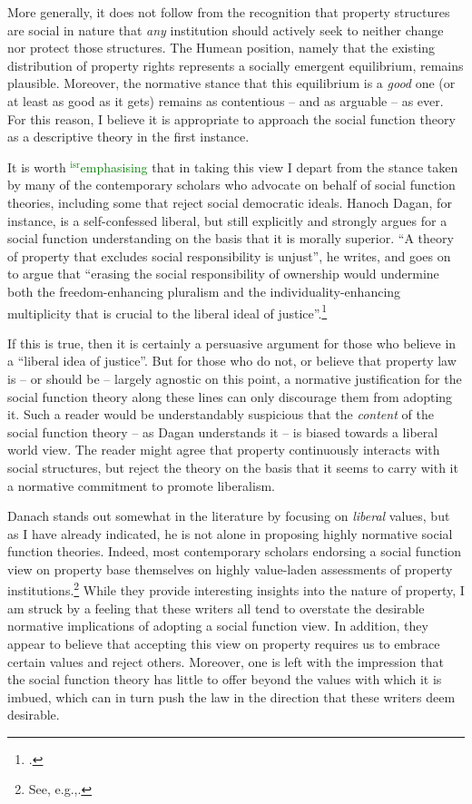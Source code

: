 \documentclass[12pt,a4paper]{book} %
\newcommand{\isr}[1]{\textcolor{green}{$^{\textrm{isr}}${#1}}}
\begin{document}
More generally, it does not follow from the recognition that property structures are social in nature that {\it any} institution should actively seek to neither change nor protect those structures. The Humean position, namely that the existing distribution of property rights represents a socially emergent equilibrium, remains plausible. Moreover, the normative stance that this equilibrium is a {\it good} one (or at least as good as it gets) remains as contentious -- and as arguable -- as ever. For this reason, I believe it is appropriate to approach the social function theory as a descriptive theory in the first instance.

It is worth \isr{emphasising} that in taking this view I depart from the stance taken by many of the contemporary scholars who advocate on behalf of social function theories, including some that reject social democratic ideals. Hanoch Dagan, for instance, is a self-confessed liberal, but still explicitly and strongly argues for a social function understanding on the basis that it is morally superior. ``A theory of property that excludes social responsibility is unjust'', he writes, and goes on to argue that ``erasing the social responsibility of ownership would undermine both the freedom-enhancing pluralism and the individuality-enhancing multiplicity that is crucial to the liberal ideal of justice''.\footcite[1259]{dagan07}

If this is true, then it is certainly a persuasive argument for those who believe in a ``liberal idea of justice''. But for those who do not, or believe that property law is -- or should be -- largely agnostic on this point, a normative justification for the social function theory along these lines can only discourage them from adopting it. Such a reader would be understandably suspicious that the {\it content} of the social function theory -- as Dagan understands it -- is biased towards a liberal world view. The reader might agree that property continuously interacts with social structures, but reject the theory on the basis that it seems to carry with it a normative commitment to promote liberalism.

Danach stands out somewhat in the literature by focusing on {\it liberal} values, but as I have already indicated, he is not alone in proposing highly normative social function theories. Indeed, most contemporary scholars endorsing a social function view on property base themselves on highly value-laden assessments of property institutions.\footnote{See, e.g.,\cite{alexander09,crawford11,davidson11,singer09,penalver09}.} While they provide interesting insights into the nature of property, I am struck by a feeling that these writers all tend to overstate the desirable normative implications of adopting a social function view. In addition, they appear to believe that accepting this view on property requires us to embrace certain values and reject others. Moreover, one is left with the impression that the social function theory has little to offer beyond the values with which it is imbued, which can in turn push the law in the direction that these writers deem desirable. 
\end{document}
